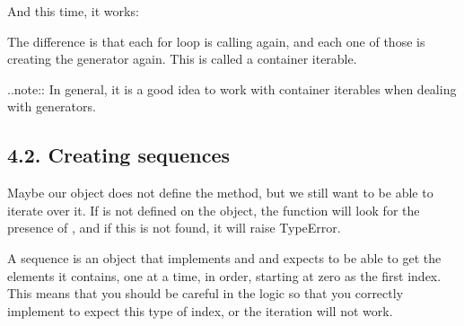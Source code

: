 \documentclass[a4paper,10pt,english]{sphinxmanual}
\begin{document}
And this time, it works:

\begin{sphinxVerbatim}[commandchars=\\\{\}]
       
 
\end{sphinxVerbatim}

The difference is that each for loop is calling  again, and each one of those is creating the generator
again. This is called a container iterable.

..note:: In general, it is a good idea to work with container iterables when dealing with generators.


\subsection{4.2. Creating sequences}
\label{\detokenize{chapters/2_pythonic_code/index:creating-sequences}}
Maybe our object does not define the  method, but we still want to be able to iterate over it. If
 is not defined on the object, the  function will look for the presence of , and if
this is not found, it will raise TypeError.

A sequence is an object that implements  and  and expects to be able to get the elements it
contains, one at a time, in order, starting at zero as the first index. This means that you should be careful in the
logic so that you correctly implement  to expect this type of index, or the iteration will not work.
\end{document}
